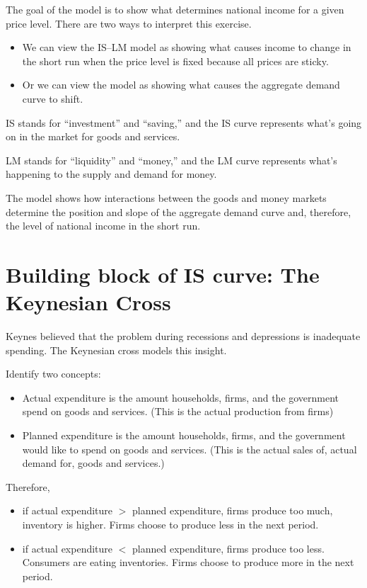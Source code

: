 \documentclass[10pt]{article}
\begin{document}
The goal of the model is to show what determines national income for a given price level. There are two ways to interpret this exercise.
\begin{itemize}
\item We can view the IS–LM model as showing what causes income to change in the short run when the price level is fixed because all prices are sticky.
\item Or we can view the model as showing what causes the aggregate demand curve to shift.
\end{itemize}
 


IS stands for “investment” and “saving,” and the IS curve represents what’s going on in the market for goods and services.

LM stands for “liquidity” and “money,” and the LM curve represents what’s happening to the supply and demand for money. 

The model shows how interactions between the goods and money markets determine the position and slope
of the aggregate demand curve and, therefore, the level of national income in the short run.






\section{Building block of IS curve: The Keynesian Cross}
Keynes believed that the problem during recessions and depressions is inadequate spending. The Keynesian cross models this insight.

Identify two concepts:
\begin{itemize}
\item Actual expenditure is the amount households, firms, and the government spend on goods and services. (This is the actual production from firms)
\item Planned expenditure is the amount households, firms, and the government would like to spend on goods and services. (This is the actual sales of, actual demand for,  goods and services.)
\end{itemize}


Therefore, 
\begin{itemize}
\item if actual expenditure $ > $ planned expenditure, firms produce too much, inventory
		is higher. Firms choose to produce less in the next period.
\item if actual expenditure $ < $ planned expenditure, firms produce too less. Consumers
		are eating inventories. Firms choose to produce more in the next period.
\end{itemize}
\end{document}

